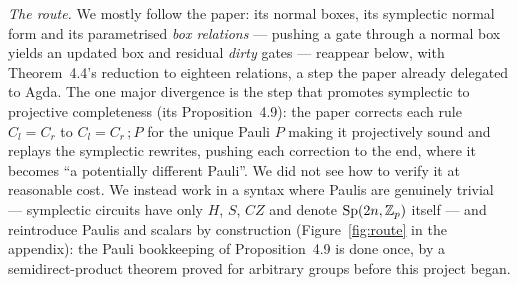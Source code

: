 \noindent\emph{The route.}  We mostly follow the paper: its normal
boxes, its symplectic normal form and its
parametrised \emph{box relations} --- pushing a gate through a normal
box yields an updated box and residual \emph{dirty} gates --- reappear
below, with Theorem~4.4's reduction to eighteen relations, a step the
paper already delegated to Agda.  The one major divergence is the step
that promotes symplectic to projective completeness (its
Proposition~4.9): the paper corrects each rule $C_l = C_r$ to $C_l =
C_r\,;P$ for the unique Pauli $P$ making it projectively sound and
replays the symplectic rewrites, pushing each correction to the end,
where it becomes ``a potentially different Pauli''.  We did not see
how to verify it at reasonable cost.  We instead work in a syntax where Paulis are
genuinely trivial --- symplectic circuits have only $H$, $S$, $CZ$ and
denote $\mathrm{Sp}(2n,\mathbb{Z}_p)$ itself --- and reintroduce Paulis and scalars by
construction (Figure~\ref{fig:route} in the appendix): the Pauli
bookkeeping of Proposition~4.9 is done once, by a semidirect-product
theorem proved for arbitrary groups before this project began.
